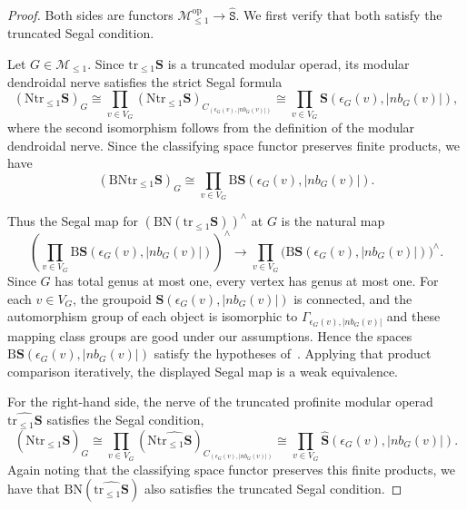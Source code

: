 \documentclass{amsart}
\newcommand{\bM}{\mathscr{M}}
\newcommand{\bS}{\mathbf{S}}
\newcommand{\isSet}{\mathtt{S}}
\newcommand{\op}{\mathrm{op}}
\newcommand{\widesthat}[1]{(#1)^{\wedge}}
\newcommand{\cs}{\mathrm{B}}
\newcommand{\nerve}{\mathrm{N}}
\newcommand{\trun}[1]{\mathrm{tr}_{\leq{#1}}}
\newcommand{\nb}{nb}
\newcommand{\corolla}{C}
\theoremstyle{definition}
\numberwithin{equation}{section}
\begin{document}
\begin{proof}
Both sides are functors $\bM_{\leq 1}^{\op}\to\widehat{\isSet}$. We first verify that both satisfy the truncated Segal condition.

Let $G\in\bM_{\leq 1}$. Since $\trun{1}\bS$ is a truncated modular operad, its modular dendroidal nerve satisfies the strict Segal formula
\[
(\nerve\trun{1}\bS)_G
\cong
\prod_{v\in V_G}
(\nerve\trun{1}\bS)_{\corolla_{(\epsilon_G(v),|\nb_G(v)|)}}
\cong
\prod_{v\in V_G}
\bS(\epsilon_G(v),|\nb_G(v)|),
\]
where the second isomorphism follows from the definition of the modular dendroidal nerve. Since the classifying space functor preserves finite products, we have
\[
(\cs\nerve\trun{1}\bS)_G
\cong
\prod_{v\in V_G}
\cs\bS(\epsilon_G(v),|\nb_G(v)|).
\]

Thus the Segal map for $\widesthat{\cs\nerve(\trun{1}\bS)}$ at $G$ is the natural map
\[
\left(
\prod_{v\in V_G}
\cs\bS(\epsilon_G(v),|\nb_G(v)|)
\right)^{\wedge}
\longrightarrow
\prod_{v\in V_G}
\bigl(\cs\bS(\epsilon_G(v),|\nb_G(v)|)\bigr)^{\wedge}.
\]
Since $G$ has total genus at most one, every vertex has genus at most one. For each $v\in V_G$, the groupoid $\bS(\epsilon_G(v),|\nb_G(v)|)$ is connected, and the automorphism group of each object is isomorphic to $\Gamma_{\epsilon_G(v),|\nb_G(v)|}$ and these mapping class groups are good under our assumptions. Hence the spaces $\cs\bS(\epsilon_G(v),|\nb_G(v)|)$ satisfy the hypotheses of~\cite[Proposition~3.9]{Boavida-Horel-Robertson}. Applying that product comparison iteratively, the displayed Segal map is a weak equivalence. 

For the right-hand side, the nerve of the truncated profinite modular operad $\widehat{\trun{1}\bS}$ satisfies the Segal condition,
\[
(\nerve\widehat{\trun{1}\bS})_G
\cong
\prod_{v\in V_G}
(\nerve\widehat{\trun{1}\bS})_{\corolla_{(\epsilon_G(v),|\nb_G(v)|)}}
\cong
\prod_{v\in V_G}
\widehat{\bS}(\epsilon_G(v),|\nb_G(v)|).
\] Again noting that the classifying space functor preserves this finite products, we have that $\cs\nerve(\widehat{\trun{1}\bS})$ also satisfies the truncated Segal condition.


\end{proof}
\end{document}
